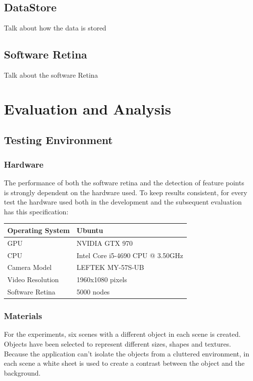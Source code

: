 \documentclass{l4proj}
\begin{document}
\section{DataStore}
Talk about how the data is stored

\section{Software Retina}
Talk about the software Retina


\chapter{Evaluation and Analysis}

\section{Testing Environment}
\subsection{Hardware}

The performance of both the software retina and the detection of feature points is strongly dependent on the hardware used. To keep results consistent, for every test the hardware used both in the development and the subsequent evaluation has this specification:

\begin{table}[H]
\centering
\begin{tabular}{l|l}
Operating System & Ubuntu\\ \hline
GPU & NVIDIA GTX 970 \\ \hline
CPU & Intel Core i5-4690 CPU @ 3.50GHz\\ \hline
Camera Model & LEFTEK MY-57S-UB \\ \hline
Video Resolution & 1960x1080 pixels \\ \hline
Software Retina & 5000 nodes

\end{tabular}
\end{table}


\subsection{Materials}
For the experiments, six scenes with a different object in each scene is created. Objects have been selected to represent different sizes, shapes and textures. Because the application can't isolate the objects from a cluttered environment, in each scene a white sheet is used to create a contrast between the object and the background.
\end{document}
